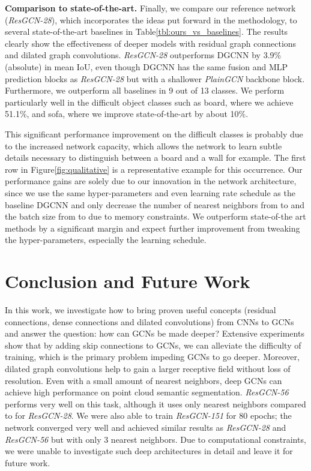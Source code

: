 \documentclass[10pt,twocolumn,letterpaper]{article}
\newcommand{\figLabel}{Figure\xspace}
\newcommand{\tblLabel}{Table\xspace}
\newcommand{\mysection}[1]{\vspace{3pt}\noindent\textbf{#1.}}
\begin{document}
\mysection{Comparison to state-of-the-art} 
Finally, we compare our reference network (\emph{ResGCN-28}), which incorporates the ideas put forward in the methodology, to several state-of-the-art baselines in \tblLabel \ref{tbl:ours_vs_baselines}. The results clearly show the effectiveness of deeper models with residual graph connections and dilated graph convolutions. \emph{ResGCN-28} outperforms DGCNN \cite{wang2018dynamic} by 3.9\% (absolute) in mean IoU, even though DGCNN has the same fusion and MLP prediction blocks as \emph{ResGCN-28} but with a shallower \emph{PlainGCN} backbone block.  
Furthermore, we outperform all baselines in 9 out of 13 classes. We perform particularly well in the difficult object classes such as board, where we achieve 51.1\%, and sofa, where we improve state-of-the-art by about 10\%.

This significant performance improvement on the difficult classes is probably due to the increased network capacity, which allows the network to learn subtle details necessary to distinguish between a board and a wall for example. The first row in \figLabel \ref{fig:qualitative} is a representative example for this occurrence. 
Our performance gains are solely due to our innovation in the network architecture, since we use the same hyper-parameters and even learning rate schedule as the baseline DGCNN \cite{wang2018dynamic} and only decrease the number of nearest neighbors from  to  and the batch size from  to  due to memory constraints. We outperform state-of-the art methods by a significant margin and expect further improvement from tweaking the hyper-parameters, especially the learning schedule.

\section{Conclusion and Future Work}
\label{sec:conclusion}

In this work, we investigate how to bring proven useful concepts (residual connections, dense connections and dilated convolutions) from CNNs to GCNs and answer the question: how can GCNs be made deeper? Extensive experiments show that by adding skip connections to GCNs, we can alleviate the difficulty of training, which is the primary problem impeding GCNs to go deeper. Moreover, dilated graph convolutions help to gain a larger receptive field without loss of resolution. Even with a small amount of nearest neighbors, deep GCNs can achieve high performance on point cloud semantic segmentation. \emph{ResGCN-56} performs very well on this task, although it uses only  nearest neighbors compared to  for \emph{ResGCN-28}. We were also able to train \emph{ResGCN-151} for 80 epochs; the network converged very well and achieved similar results as \emph{ResGCN-28} and \emph{ResGCN-56} but with only 3 nearest neighbors. Due to computational constraints, we were unable to investigate such deep architectures in detail and leave it for future work. 
\end{document}
